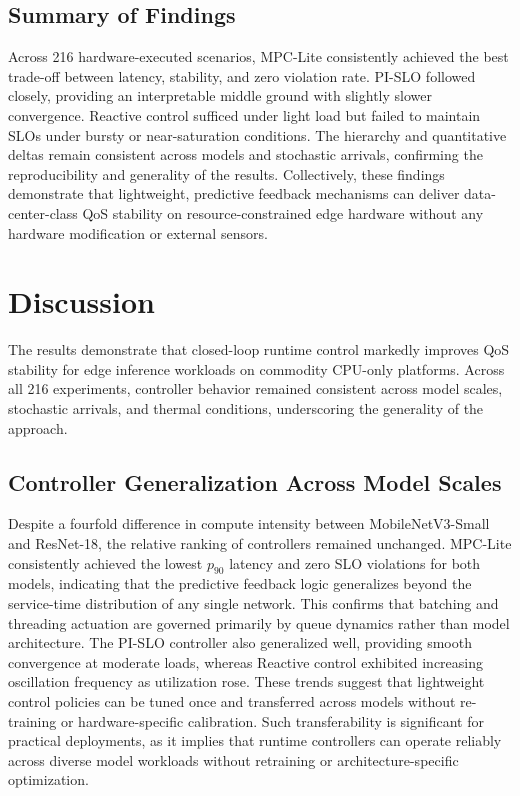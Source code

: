 \documentclass[acmsmall]{acmart}
\begin{document}
\subsection{Summary of Findings}

Across 216 hardware-executed scenarios, MPC-Lite consistently achieved the best trade-off between latency, stability, and zero violation rate.  
PI-SLO followed closely, providing an interpretable middle ground with slightly slower convergence.  
Reactive control sufficed under light load but failed to maintain SLOs under bursty or near-saturation conditions.  
The hierarchy and quantitative deltas remain consistent across models and stochastic arrivals, confirming the reproducibility and generality of the results.  
Collectively, these findings demonstrate that lightweight, predictive feedback mechanisms can deliver data-center-class QoS stability on resource-constrained edge hardware without any hardware modification or external sensors.
\section{Discussion}

The results demonstrate that closed-loop runtime control markedly improves QoS stability for edge inference workloads on commodity CPU-only platforms.  
Across all 216 experiments, controller behavior remained consistent across model scales, stochastic arrivals, and thermal conditions, underscoring the generality of the approach.

\subsection{Controller Generalization Across Model Scales}

Despite a fourfold difference in compute intensity between MobileNetV3-Small and ResNet-18, the relative ranking of controllers remained unchanged.  
MPC-Lite consistently achieved the lowest $p_{90}$ latency and zero SLO violations for both models, indicating that the predictive feedback logic generalizes beyond the service-time distribution of any single network.  
This confirms that batching and threading actuation are governed primarily by queue dynamics rather than model architecture.  
The PI-SLO controller also generalized well, providing smooth convergence at moderate loads, whereas Reactive control exhibited increasing oscillation frequency as utilization rose.  
These trends suggest that lightweight control policies can be tuned once and transferred across models without re-training or hardware-specific calibration.  
Such transferability is significant for practical deployments, as it implies that runtime controllers can operate reliably across diverse model workloads without retraining or architecture-specific optimization.
\end{document}

